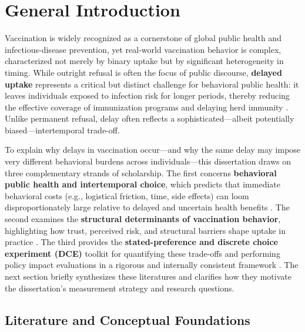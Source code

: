 \documentclass[doublespacing]{utdthesis}
\let\cite=\citep
\begin{document}
\tableofcontents
\listoffigures %
\listoftables %

\mainmatter

\chapter{General Introduction}
\doublespacing 

Vaccination is widely recognized as a cornerstone of global public health and infectious-disease prevention, yet real-world vaccination behavior is complex, characterized not merely by binary uptake but by significant heterogeneity in timing. While outright refusal is often the focus of public discourse, \textbf{delayed uptake} represents a critical but distinct challenge for behavioral public health: it leaves individuals exposed to infection risk for longer periods, thereby reducing the effective coverage of immunization programs and delaying herd immunity \cite{MacDonald2015_SAGE, Larson2014, Dai2021_Nature}. Unlike permanent refusal, delay often reflects a sophisticated—albeit potentially biased—intertemporal trade-off.

To explain why delays in vaccination occur—and why the same delay may impose very different behavioral burdens across individuals—this dissertation draws on three complementary strands of scholarship. The first concerns \textbf{behavioral public health and intertemporal choice}, which predicts that immediate behavioral costs (e.g., logistical friction, time, side effects) can loom disproportionately large relative to delayed and uncertain health benefits \cite{Frederick2002, Laibson1997, ODonoghueRabin1999}. The second examines the \textbf{structural determinants of vaccination behavior}, highlighting how trust, perceived risk, and structural barriers shape uptake in practice \cite{Brewer2017, Milkman2021_PNAS, Schmid2017}. The third provides the \textbf{stated-preference and discrete choice experiment (DCE)} toolkit for quantifying these trade-offs and performing policy impact evaluations in a rigorous and internally consistent framework \cite{Louviere2000, Train2009, Soekhai2019_Pharmacoeconomics}. The next section briefly synthesizes these literatures and clarifies how they motivate the dissertation’s measurement strategy and research questions.

\section{Literature and Conceptual Foundations}
\end{document}
